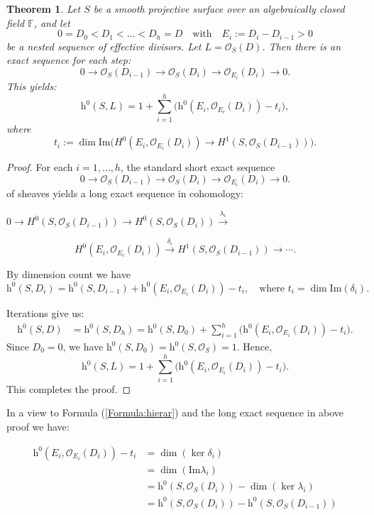 \documentclass[14pt]{amsart}
\theoremstyle{plain}
\newtheorem{thm}{\bf Theorem}[section]
\theoremstyle{definition}
\theoremstyle{remark}
\theoremstyle{example}
\def \h{\mathrm{h}}
\def \F{\mathbb{F}}
\def \O{\mathcal{O}}
\def \im{\mathrm{Im}}
\begin{document}
\begin{thm}
\label{thm:hierar_formula}
Let $S$ be a smooth projective surface over an algebraically closed field $\F$, and let 
$$0=D_0< D_1<\ldots< D_h=D\quad \text{with} \quad E_i:=D_i-D_{i-1}>0$$
be a nested sequence of effective divisors. Let $L = \O_S(D)$. Then there is an exact sequence for each step:
$$0\longrightarrow \O_S(D_{i-1})\longrightarrow\O_S(D_i)\longrightarrow\O_{E_i}(D_i) 
\longrightarrow 0.$$
This yields:
\begin{equation}
\label{Formula:hierar}
\h^0(S,L)=1+\sum_{i=1}^h \big(\h^0(E_i,\O_{E_i}(D_i))-t_i\big),
\end{equation}
where 
$$t_i:=\dim\im\big(H^0(E_i,\O_{E_i}(D_i))\to H^1(S,\O_S(D_{i-1}))\big).$$
\end{thm}
\begin{proof}
For each $i=1,\dots,h$, the standard short exact sequence
$$0\longrightarrow\O_S(D_{i-1})\longrightarrow\O_S(D_i)\longrightarrow \O_{E_i}(D_i)\longrightarrow 0.$$
of sheaves yields a long exact sequence in cohomology:

\begin{flushleft}
$0\longrightarrow H^0(S,\O_S(D_{i-1}))\longrightarrow H^0(S, \O_S(D_i))\overset{\lambda_i}{\longrightarrow}$
\end{flushleft}
\begin{flushright}
\begin{equation}
H^0(E_i, \O_{E_i}(D_i))\overset{\delta_i}{\longrightarrow} H^1(S, \O_S(D_{i-1}))
\longrightarrow \cdots .
\label{seq}
\end{equation}
\end{flushright}

By dimension count we have
$$\h^0(S, D_i) 
=\h^0(S, D_{i-1})+\h^0(E_i,\O_{E_i}(D_i))-t_i,\quad 
\text{where } t_i = \dim\im(\delta_i).$$

Iterations give us:
$$
\begin{aligned}
\h^0(S, D) &=\h^0(S, D_h) 
=\h^0(S, D_0) + \sum_{i=1}^h \Big(\h^0(E_i, \O_{E_i}(D_i)) - t_i \Big).
\end{aligned}
$$
Since $D_0=0$, we have $\h^0(S, D_0)=\h^0(S,\O_S)=1$. Hence,
$$\h^0(S,L)=1+\sum_{i=1}^h\big(\h^0(E_i,\O_{E_i}(D_i))-t_i\big).$$
This completes the proof.
\end{proof}

In a view to Formula (\ref{Formula:hierar}) and the long exact sequence in above proof we have:

\begin{align}
\h^0(E_i,\O_{E_i}(D_i))-t_i &=\dim(\ker\delta_i) \nonumber\\
 &=\dim(\im\lambda_i) \nonumber\\
 &=\h^0(S,\O_S(D_i))-\dim(\ker\lambda_i) \nonumber\\
 &=\h^0(S,\O_S(D_i))-\h^0(S,\O_S(D_{i-1})) \label{Eq:h^0-t}
\end{align}
\end{document}
